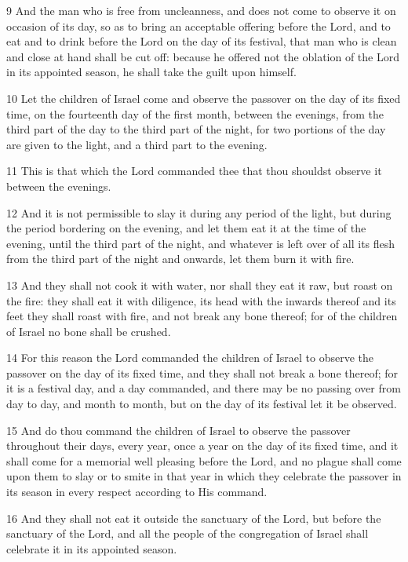 \par 9 And the man who is free from uncleanness, and does not come to observe it on occasion of its day, so as to bring an acceptable offering before the Lord, and to eat and to drink before the Lord on the day of its festival, that man who is clean and close at hand shall be cut off: because he offered not the oblation of the Lord in its appointed season, he shall take the guilt upon himself.
\par 10 Let the children of Israel come and observe the passover on the day of its fixed time, on the fourteenth day of the first month, between the evenings, from the third part of the day to the third part of the night, for two portions of the day are given to the light, and a third part to the evening.
\par 11 This is that which the Lord commanded thee that thou shouldst observe it between the evenings.
\par 12 And it is not permissible to slay it during any period of the light, but during the period bordering on the evening, and let them eat it at the time of the evening, until the third part of the night, and whatever is left over of all its flesh from the third part of the night and onwards, let them burn it with fire.
\par 13 And they shall not cook it with water, nor shall they eat it raw, but roast on the fire: they shall eat it with diligence, its head with the inwards thereof and its feet they shall roast with fire, and not break any bone thereof; for of the children of Israel no bone shall be crushed.
\par 14 For this reason the Lord commanded the children of Israel to observe the passover on the day of its fixed time, and they shall not break a bone thereof; for it is a festival day, and a day commanded, and there may be no passing over from day to day, and month to month, but on the day of its festival let it be observed.
\par 15 And do thou command the children of Israel to observe the passover throughout their days, every year, once a year on the day of its fixed time, and it shall come for a memorial well pleasing before the Lord, and no plague shall come upon them to slay or to smite in that year in which they celebrate the passover in its season in every respect according to His command.
\par 16 And they shall not eat it outside the sanctuary of the Lord, but before the sanctuary of the Lord, and all the people of the congregation of Israel shall celebrate it in its appointed season.
